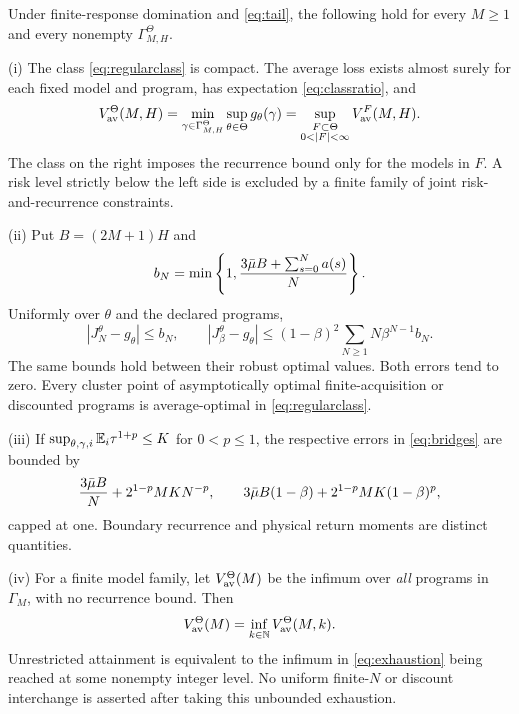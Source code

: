 \begin{theorem}\label{thm:main}
Under finite-response domination and \eqref{eq:tail}, the following hold for every $M\ge1$ and every nonempty $\Gamma_{M,H}^{\Theta}$.

\textup{(i)} The class \eqref{eq:regularclass} is compact. The average loss exists almost surely for each fixed model and program, has expectation \eqref{eq:classratio}, and
\begin{equation}\label{eq:attain}
 V_\av^\Theta(M,H)=\min_{\gam\in\Gamma_{M,H}^\Theta}\sup_{\theta\in\Theta}g_\theta(\gam)
 =\sup_{\substack{F\subset\Theta\\0<|F|<\infty}} V_\av^F(M,H).
\end{equation}
The class on the right imposes the recurrence bound only for the models in $F$. A risk level strictly below the left side is excluded by a finite family of joint risk-and-recurrence constraints.

\textup{(ii)} Put $B=(2M+1)H$ and
\begin{equation}\label{eq:bN}
 b_N=\min\left\{1,{3\bar\mu B+\sum_{s=0}^Na(s)\over N}\right\}.
\end{equation}
Uniformly over $\theta$ and the declared programs,
\begin{equation}\label{eq:bridges}
 |J_N^\theta-g_\theta|\le b_N,\qquad
 |J_\beta^\theta-g_\theta|
 \le(1-\beta)^2\sum_{N\ge1}N\beta^{N-1}b_N.
\end{equation}
The same bounds hold between their robust optimal values. Both errors tend to zero. Every cluster point of asymptotically optimal finite-acquisition or discounted programs is average-optimal in \eqref{eq:regularclass}.

\textup{(iii)} If $\sup_{\theta,\gamma,i}\mathbb E_i\tau^{1+p}\le K$ for $0<p\le1$, the respective errors in \eqref{eq:bridges} are bounded by
\begin{equation}\label{eq:moment-rate}
 {3\bar\mu B\over N}+2^{1-p}MKN^{-p},\qquad
 3\bar\mu B(1-\beta)+2^{1-p}MK(1-\beta)^p,
\end{equation}
capped at one. Boundary recurrence and physical return moments are distinct quantities.

\textup{(iv)} For a finite model family, let $V_{\mathrm{av}}^\Theta(M)$ be the infimum over \emph{all} programs in $\Gamma_M$, with no recurrence bound. Then
\begin{equation}\label{eq:exhaustion}
 V_{\mathrm{av}}^\Theta(M)=\inf_{k\in\mathbb N}V_{\mathrm{av}}^\Theta(M,k).
\end{equation}
Unrestricted attainment is equivalent to the infimum in \eqref{eq:exhaustion} being reached at some nonempty integer level. No uniform finite-$N$ or discount interchange is asserted after taking this unbounded exhaustion.


\end{theorem}
